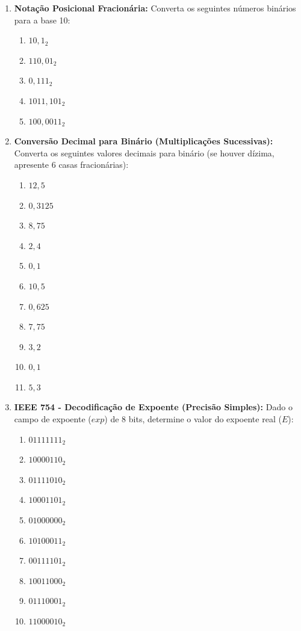 
\begin{enumerate}

    \item \textbf{Notação Posicional Fracionária:}
          Converta os seguintes números binários para a base 10:
          \begin{enumerate}
              \item $10,1_2$
              \item $110,01_2$
              \item $0,111_2$
              \item $1011,101_2$
              \item $100,0011_2$
          \end{enumerate}

    \item \textbf{Conversão Decimal para Binário (Multiplicações Sucessivas):}
          Converta os seguintes valores decimais para binário (se houver dízima, apresente 6 casas fracionárias):
          \begin{enumerate}
              \item $12,5$
              \item $0,3125$
              \item $8,75$
              \item $2,4$
              \item $0,1$
              \item $10,5$
              \item $0,625$
              \item $7,75$
              \item $3,2$
              \item $0,1$
              \item $5,3$
          \end{enumerate}


    \item \textbf{IEEE 754 - Decodificação de Expoente (Precisão Simples):}
          Dado o campo de expoente ($exp$) de 8 bits, determine o valor do expoente real ($E$):
          \begin{enumerate}
              \item $01111111_2$
              \item $10000110_2$
              \item $01111010_2$
              \item $10001101_2$
              \item $01000000_2$
              \item $10100011_2$
              \item $00111101_2$
              \item $10011000_2$
              \item $01110001_2$
              \item $11000010_2$
          \end{enumerate}


\end{enumerate}
